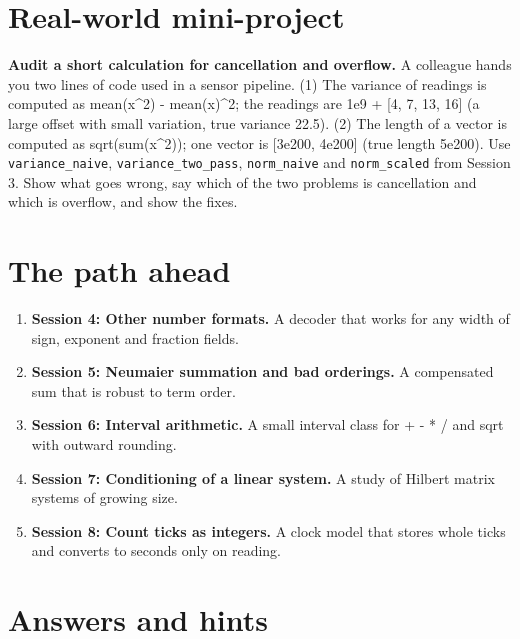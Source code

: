 \documentclass[11pt,a4paper]{article}
\begin{document}
\section{Real-world mini-project}
\textbf{Audit a short calculation for cancellation and overflow.} A colleague hands you two lines of code used in a sensor pipeline. (1) The variance of readings is computed as mean(x\textasciicircum{}2) - mean(x)\textasciicircum{}2; the readings are 1e9 + [4, 7, 13, 16] (a large offset with small variation, true variance 22.5). (2) The length of a vector is computed as sqrt(sum(x\textasciicircum{}2)); one vector is [3e200, 4e200] (true length 5e200). Use \texttt{variance\_naive}, \texttt{variance\_two\_pass}, \texttt{norm\_naive} and \texttt{norm\_scaled} from Session 3. Show what goes wrong, say which of the two problems is cancellation and which is overflow, and show the fixes.

\section{The path ahead}
\begin{enumerate}[nosep]
\item \textbf{Session 4: Other number formats.} A decoder that works for any width of sign, exponent and fraction fields.
\item \textbf{Session 5: Neumaier summation and bad orderings.} A compensated sum that is robust to term order.
\item \textbf{Session 6: Interval arithmetic.} A small interval class for + - * / and sqrt with outward rounding.
\item \textbf{Session 7: Conditioning of a linear system.} A study of Hilbert matrix systems of growing size.
\item \textbf{Session 8: Count ticks as integers.} A clock model that stores whole ticks and converts to seconds only on reading.
\end{enumerate}

\section{Answers and hints}
\end{document}
